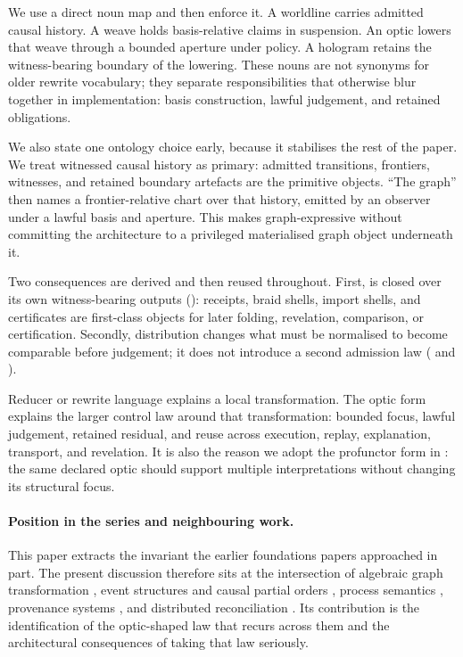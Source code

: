 \documentclass{aion}
\begin{document}
We use a direct noun map and then enforce it. A worldline carries admitted causal
history. A weave holds basis-relative claims in suspension. An optic lowers that weave
through a bounded aperture under policy. A hologram retains the witness-bearing
boundary of the lowering. These nouns are not synonyms for older rewrite vocabulary;
they separate responsibilities that otherwise blur together in implementation: basis
construction, lawful judgement, and retained obligations.

We also state one ontology choice early, because it stabilises the rest of the paper.
We treat witnessed causal history as primary: admitted transitions, frontiers, witnesses,
and retained boundary artefacts are the primitive objects. ``The graph'' then names a
frontier-relative chart over that history, emitted by an observer under a lawful basis
and aperture. This makes \WARP{} graph-expressive without committing the architecture
to a privileged materialised graph object underneath it.

Two consequences are derived and then reused throughout. First, \WARP{} is closed over
its own witness-bearing outputs (): receipts, braid shells,
import shells, and certificates are first-class objects
for later folding, revelation, comparison, or certification. Secondly, distribution changes
what must be normalised to become comparable before judgement; it does not introduce a
second admission law ( and ).

Reducer or rewrite language explains a local transformation. The optic form explains the
larger control law around that transformation: bounded focus, lawful judgement, retained
residual, and reuse across execution, replay, explanation, transport, and revelation. It is
also the reason we adopt the profunctor form in : the same declared optic should
support multiple interpretations without changing its structural focus.

\paragraph{Position in the series and neighbouring work.}
This paper extracts the invariant the earlier foundations papers approached in part. The present discussion therefore sits at the intersection of algebraic graph transformation \cite{Ehrig2006,Corradini1997}, event structures and causal partial orders \cite{Lamport1978,Winskel1987}, process semantics \cite{Hoare1985,Milner1989,Park1981}, provenance systems \cite{Buneman2001,Cheney2009}, and distributed reconciliation \cite{DeCandia2007,Shapiro2011,GilbertLynch2002}. Its contribution is the identification of the optic-shaped law that recurs across them and the architectural consequences of taking that law seriously.
\end{document}
